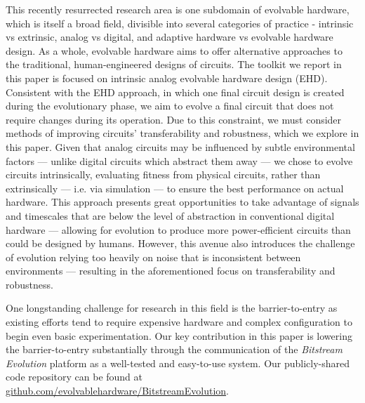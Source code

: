 \documentclass{ieeeaccess}
\begin{document}
This recently resurrected research area is one subdomain of evolvable hardware, which is itself a broad field, divisible into several categories of practice - intrinsic vs extrinsic, analog vs digital, and adaptive hardware vs evolvable hardware design.
As a whole, evolvable hardware aims to offer alternative approaches to the traditional, human-engineered designs of circuits.
The toolkit we report in this paper is focused on intrinsic analog evolvable hardware design (EHD).
Consistent with the EHD approach, in which one final circuit design is created during the evolutionary phase, we aim to evolve a final circuit that does not require changes during its operation. 
Due to this constraint, we must consider methods of improving circuits’ transferability and robustness, which we explore in this paper. 
Given that analog circuits may be influenced by subtle environmental factors --- unlike digital circuits which abstract them away ---
we chose to evolve circuits intrinsically, evaluating fitness from physical circuits, rather than extrinsically --- i.e. via simulation --- to ensure the best performance on actual hardware. 
This approach presents great opportunities to take advantage of signals and timescales that are below the level of abstraction in conventional digital hardware --- allowing for evolution to produce more power-efficient circuits than could be designed by humans.
However, this avenue also introduces the challenge of evolution relying too heavily on noise that is inconsistent between environments --- resulting in the aforementioned focus on transferability and robustness.

One longstanding challenge for research in this field is the barrier-to-entry as existing efforts tend to require expensive hardware \cite{Garvie2020EvolvedControllers} and complex configuration to begin even basic experimentation. Our key contribution in this paper is lowering the barrier-to-entry substantially through the communication of the \textit{Bitstream Evolution} platform as a well-tested and easy-to-use system. Our publicly-shared code repository can be found at \href{https://github.com/evolvablehardware/BitstreamEvolution}{github.com/evolvablehardware/BitstreamEvolution}. 
\end{document}
